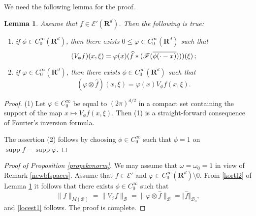 \documentclass[12pt,a4paper,reqno]{amsart}
\numberwithin{equation}{section}
\numberwithin{thm}{section}
\newtheorem{lemma}[thm]{Lemma}
\theoremstyle{definition}
\theoremstyle{remark}
\begin{document}
\par

We need the following lemma for the proof.

\par

\begin{lemma}\label{korttidslemma}
Assume that $f\in \mathscr{E}'({\mathbf R^{{d}}})$. Then the following is true:
\begin{enumerate}
\item \label{kortl1} if $\phi\in C^{\infty}_0({\mathbf R^{{d}}})$, then there
exists $0\le {\varphi} \in C^{\infty}_0({\mathbf R^{{d}}})$ such that
\begin{equation}\label{stft-ft}
(V_{\phi}f)(x,\xi )={\varphi} (x)(\widehat {f}*(\mathscr {F}(\overline
{\phi(\cdot-x)})))(\xi )\, \text ;
\end{equation}

{\vspace{0.1cm}}

\item \label{kortl2} if ${\varphi} \in C^{\infty}_0({\mathbf R^{{d}}})$, then there
exists $\phi \in C^{\infty}_0({\mathbf R^{{d}}})$ such that
\begin{equation}\label{ft-stft}
({\varphi} \otimes \widehat{f}) (x,\xi) ={\varphi} (x)V_{\phi}f(x,\xi ).
\end{equation}
\end{enumerate}
\end{lemma}

\par

\begin{proof}
(1) Let ${\varphi} \in C_0^\infty$ be equal to $(2\pi )^{d/2}$ in a
compact set containing the support of the map $x\mapsto V_\phi f(x,\xi
)$. Then (1) is a straight-forward consequence of Fourier's
inversion formula.

\par

The assertion (2) follows by choosing $\phi \in C_0^\infty$ such that
$\phi =1$ on ${\operatorname{supp}} f -{\operatorname{supp}} {\varphi}$. 
\end{proof}

\par

\begin{proof}[Proof of Proposition \ref{propekvnorm}]
We may assume that $\omega =\omega _0=1$ in view of Remark
\ref{newbfspaces}. Assume that $f\in
\mathscr E'$ and ${\varphi} \in C_0^\infty ({\mathbf R^{d}}){\setminus 0}$. From
\eqref{kortl2} of Lemma \ref{korttidslemma} it follows that there
exists $\phi \in C^{\infty}_0$ such that
\begin{equation*}
\| f\|_{M(\mathscr{B})}= \| V_{\phi}f \| _{\mathscr{B}}=
\|\varphi \otimes \widehat{f}\| _{\mathscr{B}}= {\Vert {\widehat f}\Vert _{{\mathscr
B_0}}},
\end{equation*}
and \eqref{locest1} follows. The proof is complete.
\end{proof}
\end{document}
